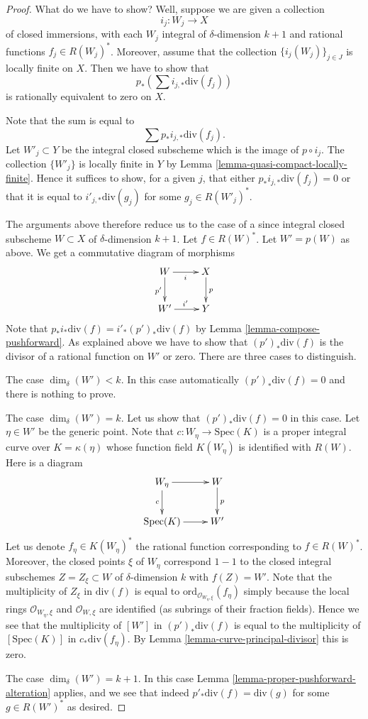 \begin{proof}
What do we have to show? Well, suppose we are given a collection
$$
i_j : W_j \longrightarrow X
$$
of closed immersions, with each $W_j$ integral of $\delta$-dimension $k + 1$
and rational functions $f_j \in R(W_j)^*$.
Moreover, assume that
the collection $\{i_j(W_j)\}_{j \in J}$ is locally finite on $X$.
Then we have to show that
$$
p_*\left(\sum i_{j, *}\text{div}(f_j)\right)
$$
is rationally equivalent to zero on $X$.

\medskip\noindent
Note that the sum is equal to
$$
\sum p_*i_{j, *}\text{div}(f_j).
$$
Let $W'_j \subset Y$ be the integral closed subscheme which is the
image of $p \circ i_j$. The collection $\{W'_j\}$ is locally finite
in $Y$ by Lemma \ref{lemma-quasi-compact-locally-finite}.
Hence it suffices to show, for a given $j$, that either
$p_*i_{j, *}\text{div}(f_j) = 0$ or that it
is equal to $i'_{j, *}\text{div}(g_j)$ for some $g_j \in R(W'_j)^*$.

\medskip\noindent
The arguments above therefore reduce us to the case of a since
integral closed subscheme $W \subset X$ of $\delta$-dimension $k + 1$.
Let $f \in R(W)^*$. Let $W' = p(W)$ as above.
We get a commutative diagram of morphisms
$$
\xymatrix{
W \ar[r]_i \ar[d]_{p'} & X \ar[d]^p \\
W' \ar[r]^{i'} & Y
}
$$
Note that $p_*i_*\text{div}(f) = i'_*(p')_*\text{div}(f)$ by
Lemma \ref{lemma-compose-pushforward}. As explained above
we have to show that $(p')_*\text{div}(f)$
is the divisor of a rational function on $W'$ or zero.
There are three cases to distinguish.

\medskip\noindent
The case $\dim_\delta(W') < k$. In this case automatically
$(p')_*\text{div}(f) = 0$ and there is nothing to prove.

\medskip\noindent
The case $\dim_\delta(W') = k$. Let us show that $(p')_*\text{div}(f) = 0$
in this case. Let $\eta \in W'$ be the generic point.
Note that $c : W_\eta \to \text{Spec}(K)$
is a proper integral curve over $K = \kappa(\eta)$
whose function field $K(W_\eta)$ is identified with $R(W)$.
Here is a diagram
$$
\xymatrix{
W_\eta \ar[r] \ar[d]_c & W \ar[d]^p \\
\text{Spec}(K) \ar[r] & W'
}
$$
Let us denote $f_\eta \in K(W_\eta)^*$ the rational function
corresponding to $f \in R(W)^*$.
Moreover, the closed points $\xi$ of $W_\eta$ correspond $1 - 1$ to the
closed integral subschemes $Z = Z_\xi \subset W$ of $\delta$-dimension $k$
with $f(Z) = W'$. Note that the multiplicity
of $Z_\xi$ in $\text{div}(f)$ is equal to
$\text{ord}_{\mathcal{O}_{W_\eta, \xi}}(f_\eta)$ simply because the
local rings $\mathcal{O}_{W_\eta, \xi}$ and $\mathcal{O}_{W, \xi}$
are identified (as subrings of their fraction fields).
Hence we see that the multiplicity of $[W']$ in
$(p')_*\text{div}(f)$ is equal to the multiplicity of
$[\text{Spec}(K)]$ in $c_*\text{div}(f_\eta)$.
By Lemma \ref{lemma-curve-principal-divisor} this is zero.

\medskip\noindent
The case $\dim_\delta(W') = k + 1$. In this case
Lemma \ref{lemma-proper-pushforward-alteration} applies,
and we see that indeed $p'_*\text{div}(f) = \text{div}(g)$
for some $g \in R(W')^*$ as desired.
\end{proof}
